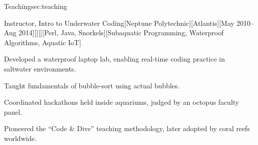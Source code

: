 \documentclass[10pt, letterpaper, extended ]{i-am-developer}
\begin{document}
\begin{devCVSection}{Teaching}{sec:teaching}
  \begin{devRole}{Instructor, Intro to Underwater Coding}[Neptune
    Polytechnic][Atlantis][May 2010--Aug
    2014][\faAnchor][\faMapMarker][Perl, Java, Snorkels][Subaquatic
    Programming, Waterproof Algorithms, Aquatic IoT]
    \begin{devItemize}
    \item Developed a waterproof laptop lab, enabling real-time
      coding practice in saltwater environments.
    \item Taught fundamentals of bubble-sort using actual bubbles.
    \item Coordinated hackathons held inside aquariums, judged by an
      octopus faculty panel.
    \item Pioneered the “Code \& Dive” teaching methodology, later
      adopted by coral reefs worldwide.
    \end{devItemize}
  \end{devRole}
\end{devCVSection}
\end{document}
